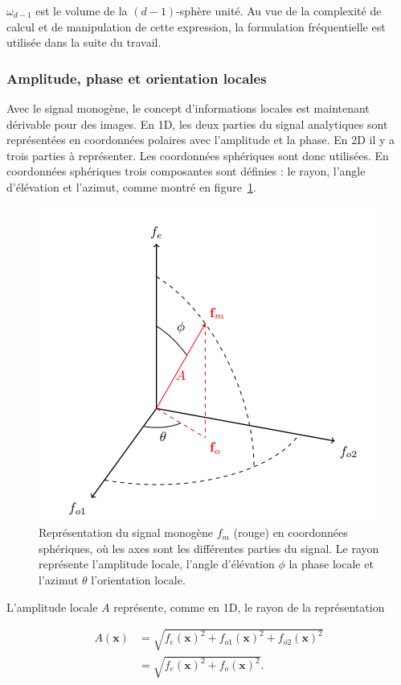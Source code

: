 \noindent $\omega_{d-1}$ est le volume de la $(d-1)$-sphère unité. Au vue de la complexité de calcul et de manipulation de cette expression, la formulation fréquentielle est utilisée dans la suite du travail.

\subsubsection{Amplitude, phase et orientation locales}

Avec le signal monogène, le concept d'informations locales est maintenant dérivable pour des images. En 1D, les deux parties du signal analytiques sont représentées en coordonnées polaires avec l'amplitude et la phase. En 2D il y a trois parties à représenter. Les coordonnées sphériques sont donc utilisées. En coordonnées sphériques trois composantes sont définies : le rayon, l'angle d'élévation et l'azimut, comme montré en figure~\ref{fig:spherical-representation}.

\bigskip

\begin{figure}
    \centering
    \includegraphics[width=.45\textwidth]{contenu/resources/images/spherical_representation}
    \caption[Représentation du signal monogène en coordonnées sphériques]{Représentation du signal monogène $f_m$ (rouge) en coordonnées sphériques, où les axes sont les différentes parties du signal. Le rayon représente l'amplitude locale, l'angle d'élévation $\phi$ la phase locale et l'azimut $\theta$ l'orientation locale.}
    \label{fig:spherical-representation}
\end{figure}

L'amplitude locale $A$ représente, comme en 1D, le rayon de la représentation

\begin{align*}
    A(\mathbf{x}) &= \sqrt{f_e(\mathbf{x})^2 + f_{o1}(\mathbf{x})^2 + f_{o2}(\mathbf{x})^2} \\
    &= \sqrt{f_e(\mathbf{x})^2 + f_o(\mathbf{x})^2}.
\end{align*}

